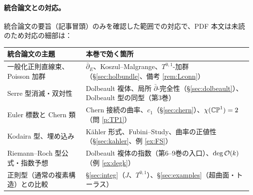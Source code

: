 \paragraph{統合論文との対応。}
統合論文の要旨（記事冒頭）のみを確認した範囲での対応で、PDF 本文は未読のため対応の細部は\tQ：
\begin{center}
\begin{tabular}{p{}p{}}
\toprule
統合論文の主題 & 本巻で効く箇所\\
\midrule
一般化正則直線束、Poisson 加群 & $\bar\partial_E$、Koszul--Malgrange、$T^{0,1}$-加群（\S\ref{sec:holbundle}、備考 \ref{rem:Lconn}）\\
Serre 型消滅・双対性 & Dolbeault 複体、局所 $\bar\partial$-完全性（\S\ref{sec:dolbeault}）、Dolbeault 型の同型（第3巻）\\
Euler 標数と Chern 類 & Chern 接続の曲率、$c_1$（\S\ref{sec:chern}）、$\chi(\mathbb{CP}^1)=2$（問 \ref{p:TP1}）\\
Kodaira 型、埋め込み & Kähler 形式、Fubini--Study、曲率の正値性（\S\ref{sec:kahler}、例 \ref{ex:FS}）\\
Riemann--Roch 型公式・指数予想 & Dolbeault 複体の指数（第6--9巻の入口）、$\deg\mathcal O(k)$（例 \ref{ex:degk}）\\
正則型（通常の複素構造）との比較 & \S\ref{sec:integ}（$J$、$T^{0,1}$）、\S\ref{sec:examples}（超曲面・トーラス）\\
\bottomrule
\end{tabular}
\end{center}

